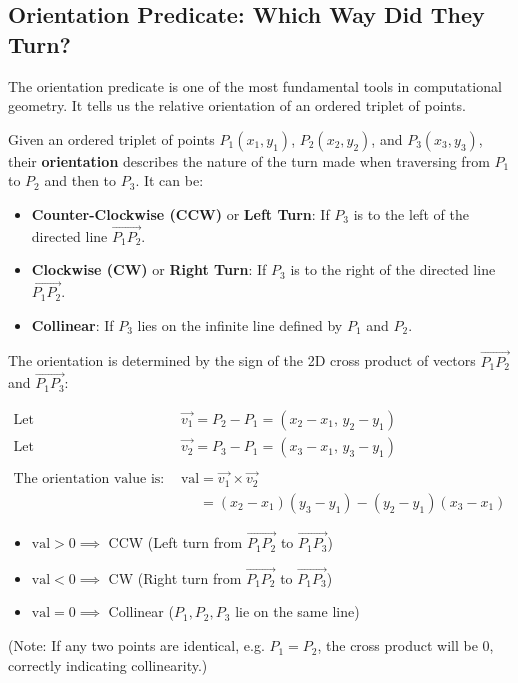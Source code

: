 \subsection{Orientation Predicate: Which Way Did They Turn?}
\label{ssec:A.1.4}

The orientation predicate is one of the most fundamental tools in computational geometry. It tells us the relative orientation of an ordered triplet of points.

\begin{definition}[Orientation]
\label{def:A.1.4.orientation}
Given an ordered triplet of points $P_1(x_1, y_1)$, $P_2(x_2, y_2)$, and $P_3(x_3, y_3)$, their \textbf{orientation} describes the nature of the turn made when traversing from $P_1$ to $P_2$ and then to $P_3$.
It can be:
\begin{itemize}
    \item \textbf{Counter-Clockwise (CCW)} or \textbf{Left Turn}: If $P_3$ is to the left of the directed line $\vec{P_1P_2}$.
    \item \textbf{Clockwise (CW)} or \textbf{Right Turn}: If $P_3$ is to the right of the directed line $\vec{P_1P_2}$.
    \item \textbf{Collinear}: If $P_3$ lies on the infinite line defined by $P_1$ and $P_2$.
\end{itemize}
The orientation is determined by the sign of the 2D cross product of vectors $\vec{P_1P_2}$ and $\vec{P_1P_3}$:

\begin{align*}
    \text{Let} \quad & \vec{v_1} = P_2 - P_1 = (x_2 - x_1,\, y_2 - y_1) \\
    \text{Let} \quad & \vec{v_2} = P_3 - P_1 = (x_3 - x_1,\, y_3 - y_1) \\
    \\
    \text{The orientation value is:} \quad
    & \text{val} = \vec{v_1} \times \vec{v_2} \\
    & \phantom{\text{val}} = (x_2 - x_1)(y_3 - y_1) - (y_2 - y_1)(x_3 - x_1)
\end{align*}

\begin{itemize}
    \item $\text{val} > 0 \implies$ CCW (Left turn from $\vec{P_1P_2}$ to $\vec{P_1P_3}$)
    \item $\text{val} < 0 \implies$ CW (Right turn from $\vec{P_1P_2}$ to $\vec{P_1P_3}$)
    \item $\text{val} = 0 \implies$ Collinear ($P_1, P_2, P_3$ lie on the same line)
\end{itemize}
(Note: If any two points are identical, e.g. $P_1=P_2$, the cross product will be 0, correctly indicating collinearity.)
\end{definition}


